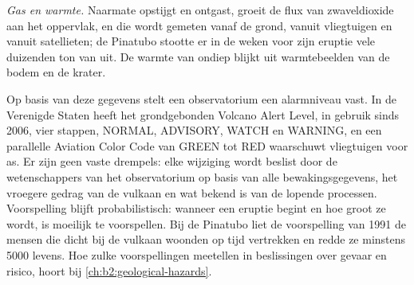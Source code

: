 \begin{omfigure}
\centering
{}
\par{}
\end{omfigure}

\emph{Gas en warmte.} Naarmate  opstijgt en ontgast, groeit de flux van zwaveldioxide aan het
oppervlak, en die wordt gemeten vanaf de grond, vanuit vliegtuigen en vanuit
satellieten; de Pinatubo stootte er in de weken voor zijn eruptie vele duizenden ton van uit.
De warmte van ondiep  blijkt uit warmtebeelden van de bodem en de krater.

Op basis van deze gegevens stelt een observatorium een alarmniveau vast. In de Verenigde Staten heeft het
grondgebonden Volcano Alert Level, in gebruik sinds 2006, vier stappen, NORMAL,
ADVISORY, WATCH en WARNING, en een parallelle Aviation Color Code van GREEN tot RED
waarschuwt vliegtuigen voor as. Er zijn geen vaste drempels: elke wijziging wordt beslist door
de wetenschappers van het observatorium op basis van alle bewakingsgegevens, het vroegere gedrag van de vulkaan
en wat bekend is van de lopende processen. Voorspelling blijft
probabilistisch: wanneer een eruptie begint en hoe groot ze wordt, is moeilijk te
voorspellen. Bij de Pinatubo liet de voorspelling van 1991 de mensen die dicht bij de
vulkaan woonden op tijd vertrekken en redde ze minstens \num{5000} levens. Hoe zulke voorspellingen
meetellen in beslissingen over gevaar en risico, hoort bij \cref{ch:b2:geological-hazards}.

